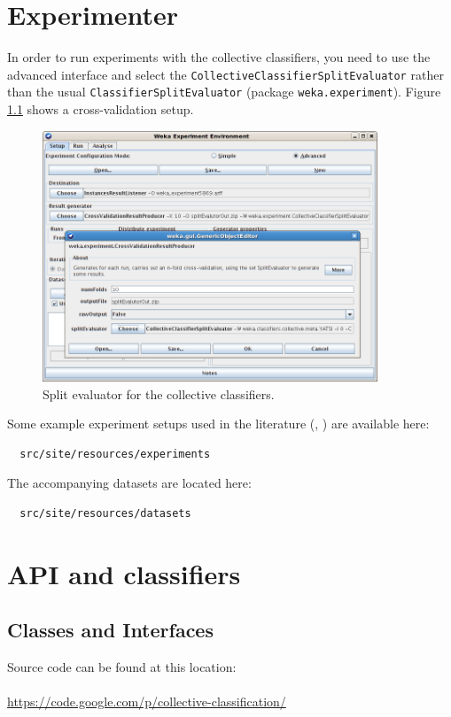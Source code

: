 \documentclass[a4paper]{book}
\begin{document}
\chapter{Experimenter}
In order to run experiments with the collective classifiers, you need to use 
the advanced interface and select the \texttt{CollectiveClassifierSplitEvaluator} rather
than the usual \texttt{ClassifierSplitEvaluator} (package \texttt{weka.experiment}). 
Figure \ref{experimenter-splitevaluator} shows a cross-validation setup.
\begin{figure}[htb]
  \centering
  \includegraphics[width=10.0cm]{images/experimenter-splitevaluator.png}
  \caption{Split evaluator for the collective classifiers.}
  \label{experimenter-splitevaluator}
\end{figure}

\noindent Some example experiment setups used in the literature (\cite{zhou}, 
\cite{yatsi}) are available here:
\begin{verbatim}
  src/site/resources/experiments
\end{verbatim}
The accompanying datasets are located here:
\begin{verbatim}
  src/site/resources/datasets
\end{verbatim}

\chapter{API and classifiers}
\section{Classes and Interfaces}
Source code can be found at this location: \\
\\
\url{https://code.google.com/p/collective-classification/}{} \\
\end{document}
